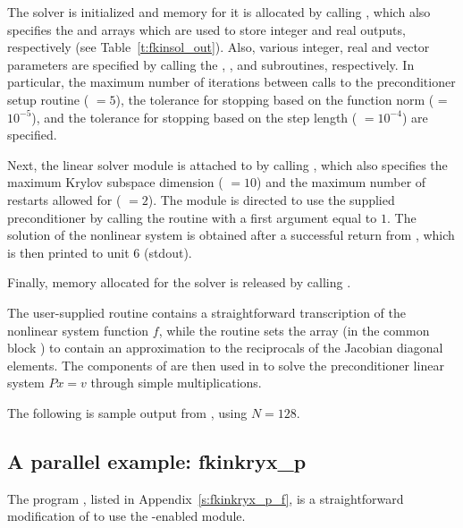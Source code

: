 The {\kinsol} solver is initialized and memory for it is allocated by
calling , which also specifies the  and 
arrays which are used to store integer and real outputs, respectively
(see Table~\ref{t:fkinsol_out}). Also,
various integer, real and vector parameters are specified by calling the
, , and  subroutines,
respectively. In particular, the maximum number of 
iterations between calls to the preconditioner setup routine ( $=5$),
the tolerance for stopping based on the function norm ( = $10^{-5}$),
and the tolerance for stopping based on the step length ( $=10^{-4}$)
are specified.

Next, the {\kinspgmr} linear solver module is attached to {\kinsol} by calling
, which also specifies the maximum Krylov subspace dimension
( $=10$) and the maximum number of restarts allowed for {\spgmr}
( $=2$).  The {\kinspgmr} module is directed to use the supplied
preconditioner by  calling the  routine
with a first argument equal to $1$. The solution of the
nonlinear system is obtained after a successful return from , which
is then printed to unit 6 (stdout).

Finally, memory allocated for the {\kinsol} solver is released by
calling .

The user-supplied routine  contains a straightforward transcription
of the nonlinear system function $f$, while the routine  sets the
array  (in the common block ) to contain an approximation to 
the reciprocals of the Jacobian diagonal elements. The components of  are
then used in  to solve the preconditioner linear system $Px=v$
through simple multiplications.

The following is sample output from , using $N = 128$.



\subsection{A parallel example: fkinkryx\_p}\label{ss:fkinkryx_p}

The program , listed in Appendix~\ref{s:fkinkryx_p_f}, is a
straightforward modification of  to use the {\mpi}-enabled
{\nvecp} module.

